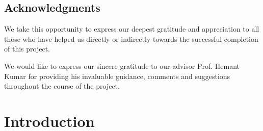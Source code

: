 \documentclass[letterpaper,11pt]{report}
\begin{document}
\newpage
\section*{Acknowledgments}\label{section:acknowledgments}
\pagestyle{plain}
We take this opportunity to express our deepest gratitude and appreciation to all those
who have helped us directly or indirectly towards the successful completion of this project.
\par
We would like to express our sincere gratitude to our advisor Prof. Hemant Kumar for providing his invaluable guidance, comments and suggestions throughout the course of the project.


\vspace{2in}

\newpage

\tableofcontents

\listoffigures

\chapter{Introduction}\label{chapter:introduction}
\setcounter{page}{1}
\onehalfspacing
\end{document}
